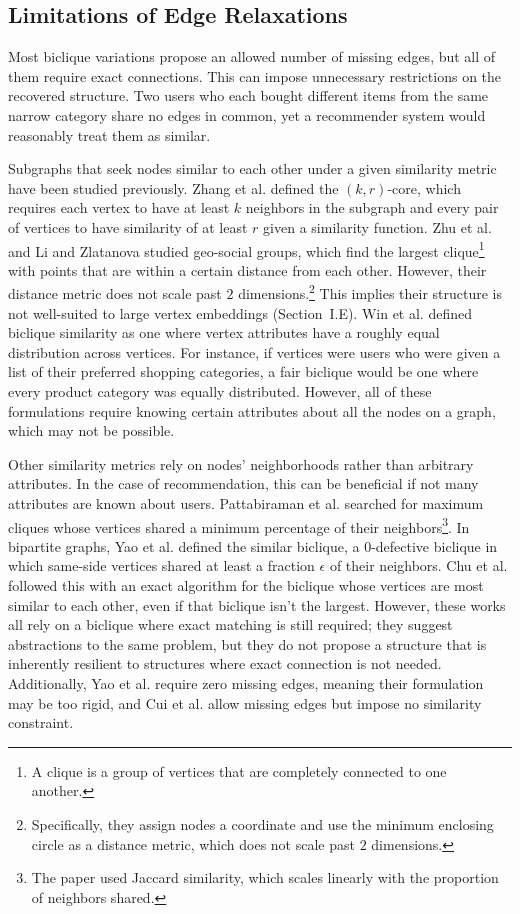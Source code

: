 \documentclass[conference]{IEEEtran}
\begin{document}
\subsection{Limitations of Edge Relaxations}

Most biclique variations propose an allowed number of missing edges, but all of them require exact connections. This can impose unnecessary restrictions on the recovered structure. Two users who each bought different items from the same narrow category share no edges in common, yet a recommender system would reasonably treat them as similar.

Subgraphs that seek nodes similar to each other under a given similarity metric have been studied previously. Zhang et al. \cite{zhang2016core} defined the $(k, r)$-core, which requires each vertex to have at least $k$ neighbors in the subgraph and every pair of vertices to have similarity of at least $r$ given a similarity function. Zhu et al. \cite{zhu2017} and Li and Zlatanova \cite{li2021significant} studied geo-social groups, which find the largest clique\footnote{A clique is a group of vertices that are completely connected to one another.} with points that are within a certain distance from each other. However, their distance metric does not scale past $2$ dimensions.\footnote{Specifically, they assign nodes a coordinate and use the minimum enclosing circle as a distance metric, which does not scale past $2$ dimensions.} This implies their structure is not well-suited to large vertex embeddings (Section~I.E). Win et al. \cite{win2023} defined biclique similarity as one where vertex attributes have a roughly equal distribution across vertices. For instance, if vertices were users who were given a list of their preferred shopping categories, a fair biclique would be one where every product category was equally distributed. However, all of these formulations require knowing certain attributes about all the nodes on a graph, which may not be possible.

Other similarity metrics rely on nodes' neighborhoods rather than arbitrary attributes. In the case of recommendation, this can be beneficial if not many attributes are known about users. Pattabiraman et al. \cite{pattabiraman_2012} searched for maximum cliques whose vertices shared a minimum percentage of their neighbors\footnote{The paper used Jaccard similarity, which scales linearly with the proportion of neighbors shared.}. In bipartite graphs, Yao et al. \cite{yao2022identifying} defined the similar biclique, a $0$-defective biclique in which same-side vertices shared at least a fraction $\epsilon$ of their neighbors. Chu et al. \cite{chu2025} followed this with an exact algorithm for the biclique whose vertices are most similar to each other, even if that biclique isn't the largest. However, these works all rely on a biclique where exact matching is still required; they suggest abstractions to the same problem, but they do not propose a structure that is inherently resilient to structures where exact connection is not needed. Additionally, Yao et al. \cite{yao2022identifying} require zero missing edges, meaning their formulation may be too rigid, and Cui et al. \cite{cui2025efficient} allow missing edges but impose no similarity constraint.
\end{document}
